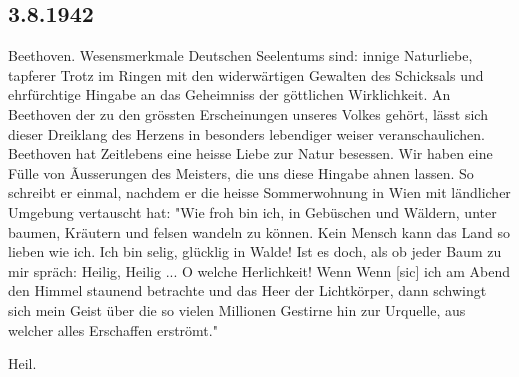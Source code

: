 \subsection{3.8.1942}

Beethoven.
Wesensmerkmale Deutschen Seelentums sind: innige Naturliebe, tapferer Trotz im Ringen mit den widerw\"{a}rtigen Gewalten des Schicksals und ehrf\"{u}rchtige Hingabe an das Geheimniss der g\"{o}ttlichen Wirklichkeit.
An Beethoven der zu den gr\"{o}ssten Erscheinungen unseres Volkes geh\"{o}rt, l\"{a}sst sich dieser Dreiklang des Herzens in besonders lebendiger weiser veranschaulichen.
Beethoven hat Zeitlebens eine heisse Liebe zur Natur besessen.
Wir haben eine F\"{u}lle von Ãusserungen des Meisters, die uns diese Hingabe ahnen lassen.
So schreibt er einmal, nachdem er die heisse Sommerwohnung in Wien mit l\"{a}ndlicher Umgebung vertauscht hat:
"Wie froh bin ich, in Geb\"{u}schen und W\"{a}ldern, unter baumen, Kr\"{a}utern und felsen wandeln zu k\"{o}nnen.
Kein Mensch kann das Land so lieben wie ich.
Ich bin selig, gl\"{u}cklig in Walde!
Ist es doch, als ob jeder Baum zu mir spr\"{a}ch: Heilig, Heilig ... O welche Herlichkeit!
Wenn Wenn {\color{red} [sic] } ich am Abend den Himmel staunend betrachte und das Heer der Lichtk\"{o}rper, dann schwingt sich mein Geist \"{u}ber die so vielen Millionen Gestirne hin zur Urquelle, aus welcher alles Erschaffen erstr\"{o}mt."

Heil.

\clearpage
